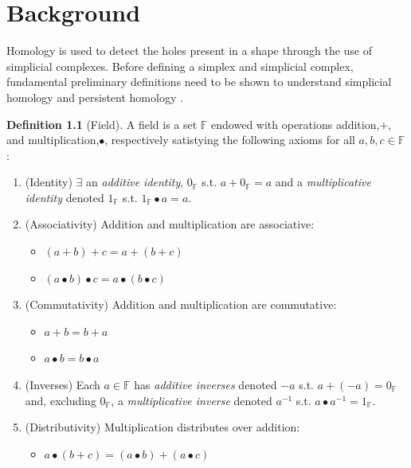 \documentclass[ma]{uncgdissertationexp}
\theoremstyle{plain}
\theoremstyle{definition}
\newtheorem{definition}[theorem]{Definition}
\theoremstyle{remark}
\begin{document}
\chapter{Background}

\par Homology is used to detect the holes present in a shape through the use of simplicial complexes. Before defining a simplex and simplicial complex, fundamental preliminary definitions need to be shown to understand simplicial homology and persistent homology \cite{Needham_2019}.

\begin{definition}[Field]
A field is a set $\mathbb{F}$ endowed with operations addition,$+$, and multiplication,$\bullet$, respectively satistying the following axioms for all $a,b,c\in\mathbb{F}$:
\begin{enumerate}
\item (Identity) $\exists$ an \textit{additive identity}, $0_{\mathbb{F}}$ s.t. $a+0_{\mathbb{F}}=a$ and a \textit{multiplicative identity} denoted $1_{\mathbb{F}}$ s.t. $1_{\mathbb{F}}\bullet a = a$.
\item (Associativity) Addition and multiplication are associative:
\begin{itemize}
\item $(a+b) + c = a + (b+c)$
\item $(a\bullet b) \bullet c = a \bullet (b \bullet c)$
\end{itemize}
\item (Commutativity) Addition and multiplication are commutative:
\begin{itemize}
\item $a + b = b + a$
\item $a \bullet b = b \bullet a$
\end{itemize}
\item (Inverses) Each $a \in \mathbb{F}$ has \textit{additive inverses} denoted $-a$ s.t. $a + (-a) = 0_{\mathbb{F}}$ and, excluding $0_\mathbb{F}$, a \textit{multiplicative inverse} denoted $a^{-1}$ s.t. $a \bullet a^{-1}=1_\mathbb{F}$.
\item (Distributivity) Multiplication distributes over addition:
\begin{itemize}
\item $a \bullet (b+c) = (a \bullet b) + (a \bullet c)$
\end{itemize}
\end{enumerate}
\end{definition}
\end{document}
